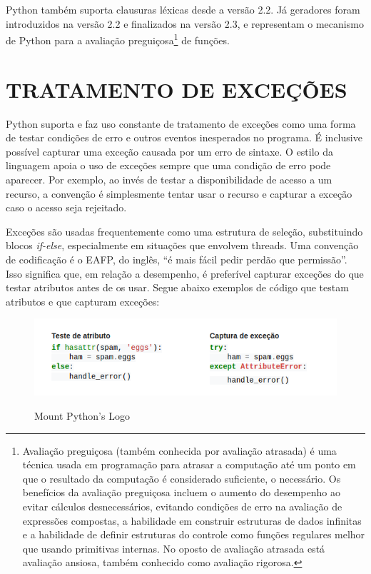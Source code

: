 Python também suporta clausuras léxicas desde a versão 2.2.
Já geradores foram introduzidos na versão 2.2 e finalizados na versão 2.3, e representam o mecanismo de Python para a avaliação preguiçosa\footnote{
    Avaliação preguiçosa (também conhecida por avaliação atrasada) é uma técnica usada em programação para atrasar a computação até um ponto em que o resultado da computação é considerado suficiente, o necessário.
Os benefícios da avaliação preguiçosa incluem o aumento do desempenho ao evitar cálculos desnecessários, evitando condições de erro na avaliação de expressões compostas, a habilidade em construir estruturas de dados infinitas e a habilidade de definir estruturas do controle como funções regulares melhor que usando primitivas internas.
No oposto de avaliação atrasada está avaliação ansiosa, também conhecido como avaliação rigorosa. 
} de funções. 


\section{TRATAMENTO DE EXCEÇÕES}

Python suporta e faz uso constante de tratamento de exceções como uma forma de testar condições de erro e outros eventos inesperados no programa.
É inclusive possível capturar uma exceção causada por um erro de sintaxe.
O estilo da linguagem apoia o uso de exceções sempre que uma condição de erro pode aparecer.
Por exemplo, ao invés de testar a disponibilidade de acesso a um recurso, a convenção é simplesmente tentar usar o recurso e capturar a exceção caso o acesso seja rejeitado.

\par Exceções são usadas frequentemente como uma estrutura de seleção, substituindo blocos \textit{if-else}, especialmente em situações que envolvem threads.
Uma convenção de codificação é o EAFP, do inglês, “é mais fácil pedir perdão que permissão”.
Isso significa que, em relação a desempenho, é preferível capturar exceções do que testar atributos antes de os usar.
Segue abaixo exemplos de código que testam atributos e que capturam exceções:

\begin{figure}[!htb]
    \centering
    \caption{Mount Python’s Logo}
    \includegraphics[width=1\textwidth]{./dados/figuras/tryCatch.png}
    \label{fig:figura-mountPython}
\end{figure}

